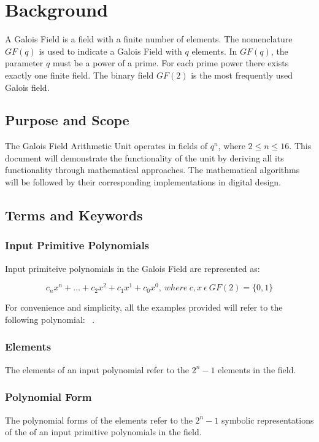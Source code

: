\section{Background} A Galois Field is a field with a finite number of
elements. The nomenclature $GF(q)$ is used to indicate a Galois Field with $q$
elements. In $GF(q)$, the parameter $q$ must be a power of a prime. For each
prime power there exists exactly one finite field. The binary field $GF(2)$ is
the most frequently used Galois field. \cite{wolfdef}

    \subsection{Purpose and Scope} The Galois Field Arithmetic Unit
    operates in fields of $q^n$, where $2 \leq n \leq 16$. This document
    will demonstrate the functionality of the unit by deriving all its
    functionality through mathematical approaches. The mathematical
    algorithms will be followed by their corresponding implementations in
    digital design.

    \subsection{Terms and Keywords}

        \subsubsection{Input Primitive Polynomials} Input primiteive
        polynomials in the Galois Field are represented as:

        \[ c_{n}x^{n}+\ldots+c_{2}x^{2}+c_{1}x^{1}+c_{0}x^{0}, \ where \
        c,x \ \epsilon \ GF(2)=\{0,1\} \]

        For convenience and simplicity, all the examples provided will
        refer to the following polynomial: \examplepoly~.

        \subsubsection{Elements} The elements of an input polynomial refer
        to the $2^{n}-1$ elements in the field.

        \subsubsection{Polynomial Form} The polynomial forms of the
        elements refer to the $2^{n}-1$ symbolic representations of the of
        an input primitive polynomials in the field.

